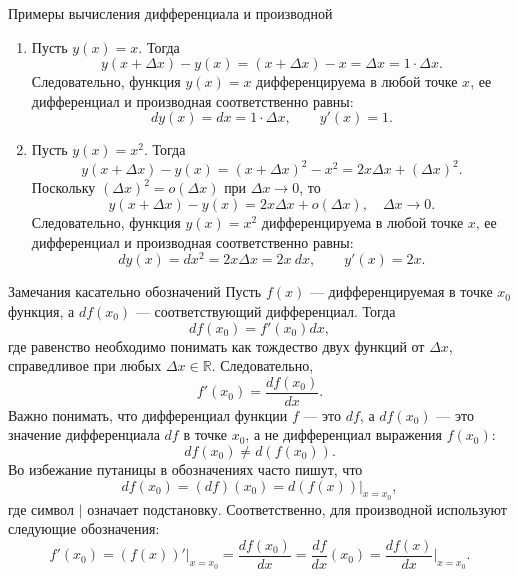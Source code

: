 \documentclass[8pt]{beamer}
\begin{document}
\begin{frame}{Примеры вычисления дифференциала и производной}
\begin{enumerate}
\item Пусть $y(x)=x$. Тогда
$$y(x+\Delta x) - y(x) =(x+\Delta x) - x = \Delta x = 1\cdot \Delta x.$$
Следовательно, функция $y(x)=x$ дифференцируема в любой точке $x$, ее дифференциал и производная соответственно равны:
$$dy(x) = dx = 1\cdot \Delta x, \qquad y'(x) = 1.$$
\item Пусть $y(x)=x^2$. Тогда
$$y(x+\Delta x) - y(x) = (x+\Delta x)^2 - x^2 = 2 x \Delta x +\left(\Delta x\right)^2.$$
Поскольку $\left(\Delta x\right)^2=o(\Delta x)$ при $\Delta x\to0$, то
$$y(x+\Delta x) - y(x) =  2 x \Delta x +o(\Delta x),\quad \Delta x\to0.$$
Следовательно, функция $y(x)=x^2$ дифференцируема в любой точке $x$, ее дифференциал и производная соответственно равны:
$$dy(x) = dx^2 = 2 x \Delta x=2x\ dx, \qquad y'(x) = 2x.$$
\end{enumerate}
\end{frame}

\begin{frame}{Замечания касательно обозначений}
Пусть $f(x)$ --- дифференцируемая в точке $x_0$ функция, а $df(x_0)$ --- соответствующий дифференциал. Тогда
$$df(x_0) = f'(x_0) d x,$$
 где равенство необходимо понимать как тождество двух функций от $\Delta x$, справедливое при любых $\Delta x\in\mathbb{R}$. Следовательно,
$$f'(x_0) = \frac{df(x_0)}{dx}.$$
Важно понимать, что дифференциал функции $f$ --- это $df$, а $df(x_0)$ --- это значение дифференциала $df$ в точке $x_0$, а не дифференциал выражения $f(x_0)$:
$$df(x_0)\ne d\left( f(x_0) \right).$$
 Во избежание путаницы в обозначениях часто пишут, что
 $$df(x_0) = (df)(x_0) = d\left(f(x)\right)\Big|_{x=x_0},$$
где символ $\Big|$ означает подстановку. Соответственно, для производной используют следующие обозначения:
$$f'(x_0) =\left( f(x) \right)'\Big|_{x=x_0} = \frac{df(x_0)}{dx} = \frac{df}{dx}(x_0) = \frac{df(x)}{dx}\Big|_{x=x_0}.$$
\end{frame}
\end{document}

